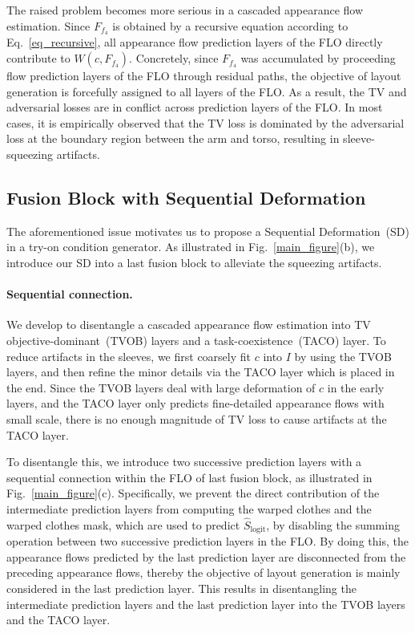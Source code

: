 \documentclass[letterpaper]{article} %
\begin{document}
The raised problem becomes more serious in a cascaded appearance flow estimation.
Since $F_{f_4}$ is obtained by a recursive equation according to Eq.~\ref{eq_recursive}, all appearance flow prediction layers of the FLO directly contribute to $W(c,F_{f_4})$.
Concretely, since $F_{f_4}$ was accumulated by proceeding flow prediction layers of the FLO through residual paths, the objective of layout generation is forcefully assigned to all layers of the FLO.
As a result, the TV and adversarial losses are in conflict across prediction layers of the FLO.
In most cases, it is empirically observed that the TV loss is dominated by the adversarial loss at the boundary region between the arm and torso, resulting in sleeve-squeezing artifacts.

\subsection{Fusion Block with Sequential Deformation}
The aforementioned issue motivates us to propose a Sequential Deformation~(SD) in a try-on condition generator.
As illustrated in Fig.~\ref{main_figure}(b), we introduce our SD into a last fusion block to alleviate the squeezing artifacts.

\paragraph{Sequential connection.} 
We develop to disentangle a cascaded appearance flow estimation into TV objective-dominant~(TVOB) layers and a task-coexistence~(TACO) layer.
To reduce artifacts in the sleeves, we first coarsely fit $c$ into $I$ by using the TVOB layers, and then refine the minor details via the TACO layer which is placed in the end.
Since the TVOB layers deal with large deformation of $c$ in the early layers, and the TACO layer only predicts fine-detailed appearance flows with small scale, there is no enough magnitude of TV loss to cause artifacts at the TACO layer.

To disentangle this, we introduce two successive prediction layers with a sequential connection within the FLO of last fusion block, as illustrated in Fig.~\ref{main_figure}(c).
Specifically, we prevent the direct contribution of the intermediate prediction layers from computing the warped clothes and the warped clothes mask, which are used to predict $\hat{S}_{\text{logit}}$, by disabling the summing operation between two successive prediction layers in the FLO.
By doing this, the appearance flows predicted by the last prediction layer are disconnected from the preceding appearance flows, thereby the objective of layout generation is mainly considered in the last prediction layer.
This results in disentangling the intermediate prediction layers and the last prediction layer into the TVOB layers and the TACO layer.
\end{document}
